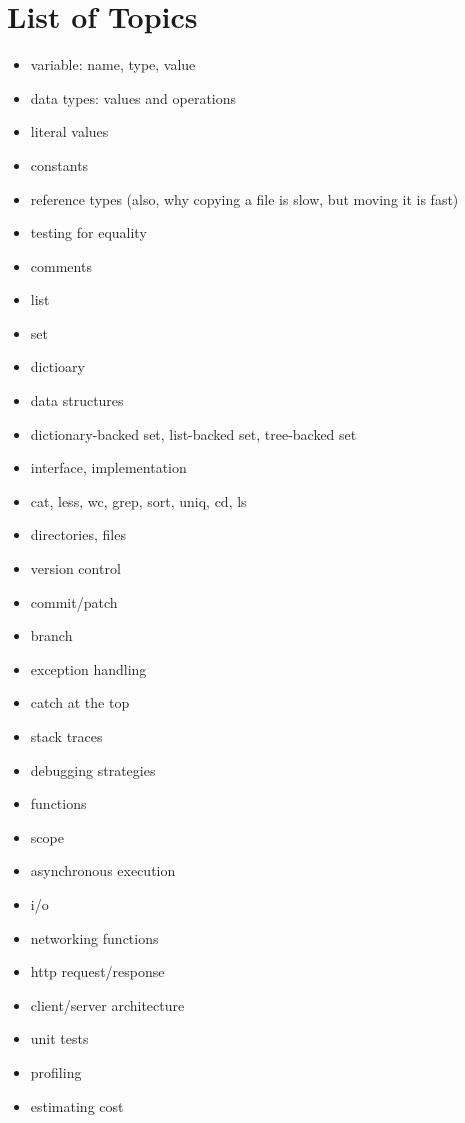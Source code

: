 \section{List of Topics}
\begin{itemize}
  \item variable: name, type, value
  \item data types: values and operations
  \item literal values
  \item constants
  \item reference types (also, why copying a file is slow, but moving it is fast)
  \item testing for equality
  \item comments

  \item list
  \item set
  \item dictioary
  \item data structures
  \item dictionary-backed set, list-backed set, tree-backed set
  \item interface, implementation

  \item cat, less, wc, grep, sort, uniq, cd, ls
  \item directories, files

  \item version control
  \item commit/patch
  \item branch

  \item exception handling
  \item catch at the top
  \item stack traces
  \item debugging strategies

  \item functions
  \item scope
  \item asynchronous execution
  \item i/o
  \item networking functions

  \item http request/response
  \item client/server architecture

  \item unit tests
  \item profiling
  \item estimating cost


\end{itemize}
